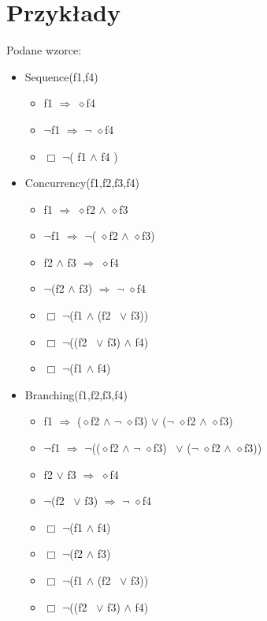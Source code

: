 \documentclass[a4paper, 11pt]{article}
\begin{document}
	\section{Przykłady}
Podane wzorce:
	\begin{itemize}
					\item Sequence(f1,f4)
		\begin{itemize}
			\item f1 $ \Rightarrow $  $\diamond$f4 	
			\item $\neg$f1 $ \Rightarrow $ $\neg$ $\diamond$f4
			\item $\Box$ $\neg$( f1  $\wedge$  f4 )
		\end{itemize}
		\item Concurrency(f1,f2,f3,f4)
		\begin{itemize}
			\item f1 $ \Rightarrow $  $\diamond$f2  $\wedge$  $\diamond$f3
			\item $\neg$f1 $ \Rightarrow $  $\neg$( $\diamond$f2  $\wedge$  $\diamond$f3)
			\item f2  $\wedge$  f3  $ \Rightarrow$  $\diamond$f4
			\item $\neg$(f2  $\wedge$  f3)  $ \Rightarrow $  $\neg$ $\diamond$f4
			\item $\Box$ $\neg$(f1  $\wedge$  (f2 \ $\vee$  f3))
			\item $\Box$ $\neg$((f2 \ $\vee$  f3)  $\wedge$  f4)
			\item $\Box$ $\neg$(f1  $\wedge$  f4)	
		\end{itemize}
		\item Branching(f1,f2,f3,f4)
		\begin{itemize}
			\item f1  $ \Rightarrow $  ($\diamond$f2  $\wedge$  $\neg$ $\diamond$f3)  $\vee$  ($\neg$ $\diamond$f2  $\wedge$  $\diamond$f3)
			\item $\neg$f1  $ \Rightarrow $  $\neg$(($\diamond$f2  $\wedge$  $\neg$ $\diamond$f3) \ $\vee$  ($\neg$ $\diamond$f2  $\wedge$  $\diamond$f3))
			\item f2 $\vee$  f3  $ \Rightarrow $  $\diamond$f4
			\item $\neg$(f2 \ $\vee$  f3)  $ \Rightarrow$  $\neg$ $\diamond$f4
			\item $\Box$ $\neg$(f1  $\wedge$  f4)
			\item $\Box$ $\neg$(f2  $\wedge$  f3)
			\item $\Box$ $\neg$(f1  $\wedge$  (f2 \ $\vee$  f3))
			\item $\Box$ $\neg$((f2 \ $\vee$  f3)  $\wedge$  f4)

\end{itemize}
\end{itemize}
\end{document}
